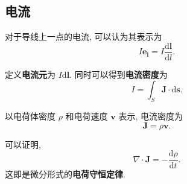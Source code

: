 \subsection{电流}
对于导线上一点的电流, 可以认为其表示为
\begin{equation*}
    I\bm{e_l}=I\frac{\mathrm{d}\bm{l}}{\mathrm{d}l}.
\end{equation*}

定义\textbf{电流元}为 $I\mathrm{d}\bm{l}$. 同时可以得到\textbf{电流密度}为
\begin{equation}
    I=\int_S\bm{J}\cdot\mathrm{d}\bm{s}.
\end{equation}

以电荷体密度 $\rho$ 和电荷速度 $\bm{v}$ 表示, 电流密度为
\begin{equation}
    \bm{J}=\rho\bm{v}.
\end{equation}

可以证明,
\begin{equation}
    \nabla\cdot\bm{J}=-\frac{\mathrm{d}\rho}{\mathrm{d}t}.
\end{equation}
这即是微分形式的\textbf{电荷守恒定律}.
